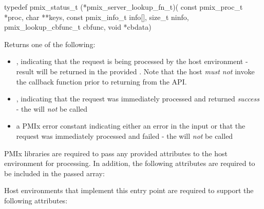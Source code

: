 \format

\cspecificstart
\begin{codepar}
typedef pmix_status_t (*pmix_server_lookup_fn_t)(
                             const pmix_proc_t *proc,
                             char **keys,
                             const pmix_info_t info[],
                             size_t ninfo,
                             pmix_lookup_cbfunc_t cbfunc,
                             void *cbdata)
\end{codepar}
\cspecificend

\begin{arglist}
\end{arglist}

Returns one of the following:

\begin{itemize}
    \item {}, indicating that the request is being processed by the host environment - result will be returned in the provided . Note that the host \emph{must not} invoke the callback function prior to returning from the \ac{API}.
    \item {}, indicating that the request was immediately processed and returned \textit{success} - the  will \textit{not} be called
    \item a PMIx error constant indicating either an error in the input or that the request was immediately processed and failed - the  will \textit{not} be called
\end{itemize}

\reqattrstart
\ac{PMIx} libraries are required to pass any provided attributes to the host environment for processing. In addition, the following attributes are required to be included in the passed  array:


\divider

Host environments that implement this entry point are required to support the following attributes:

